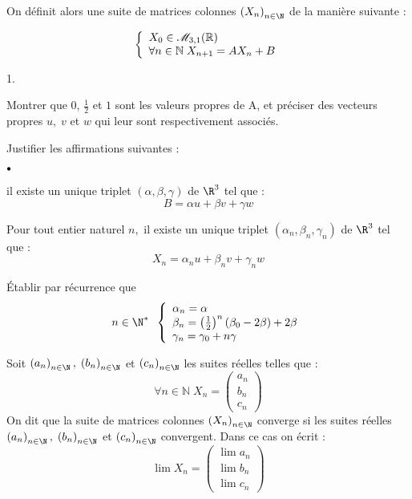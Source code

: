 \documentclass[11pt]{article}%
\begin{document}
On définit alors une suite de matrices colonnes $\left( X_{n}\right)
_{n\in \N}$ de la manière suivante :

\[
\left\{ 
\begin{array}{l}
X_{0}\in \mathscr{M}_{3,1}(\mathbb{R}) \\
\forall n\in \mathbb{N\;}X_{n + 1} = AX_{n} + B
\end{array}
\right. 
\]

\begin{noliste}{1.}
 \setlength{\itemsep}{4mm}
\item Montrer que 0, $\frac{1}{2}$ et $1$ sont les valeurs propres de
A, et préciser des
vecteurs propres $u,\;v$ et $w$ qui leur sont respectivement associés.

\item Justifier les affirmations suivantes :

\begin{noliste}{$\scriptstyle \bullet$}
\item il existe un unique triplet $\left( \alpha,\beta,\gamma \right) $
de 
$\R^{3}$ tel que : 
\[
B = \alpha u + \beta v + \gamma w 
\]

\item Pour tout entier naturel $n,$ il existe un unique triplet $\left(
\alpha_{n},\beta_{n},\gamma_{n}\right) $ de $\R^{3}$ tel que : 
\[
X_{n} = \alpha_{n}u + \beta_{n}v + \gamma_{n}w 
\]
\end{noliste}

\item Établir par récurrence que 
\[
n\in \N^{*}\;\;\left\{ 
\begin{array}{l}
\alpha_{n} = \alpha \\
\beta_{n} = \left( \frac{1}{2}\right) ^{n}\left( \beta_{0}-2\beta
\right)
 + 2\beta \\
\gamma_{n} = \gamma_{0} + n\gamma
\end{array}
\right. 
\]

\item Soit $\left( a_{n}\right)_{n\in \N},\;\left( b_{n}\right)
_{n\in \N}$ et $\left( c_{n}\right)_{n\in \N}$ les suites réelles
telles que : 
\[
\forall n\in \mathbb{N\;}X_{n} = \left( 
\begin{array}{c}
a_{n} \\
b_{n} \\
c_{n}
\end{array}
\right) 
\]
On dit que la suite de matrices colonnes $\left( X_{n}\right)_{n\in \N}
$ converge si les suites réelles $\left( a_{n}\right)_{n\in
\N},\;\left( b_{n}\right)_{n\in \N}$ et $\left( c_{n}\right)_{n\in 
\N}$ convergent. Dans ce cas on écrit : 
\[
\lim X_{n} = \left( 
\begin{array}{c}
\lim a_{n} \\
\lim b_{n} \\
\lim c_{n}
\end{array}
\right) 
\]


\end{noliste}
\end{document}

